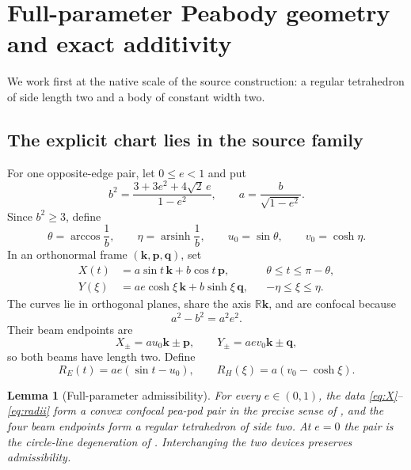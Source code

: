 \documentclass[11pt]{article}
\numberwithin{equation}{section}
\newtheorem{lemma}[theorem]{Lemma}
\theoremstyle{remark}
\newcommand{\R}{\mathbb{R}}
\newcommand{\arsinh}{\operatorname{arsinh}}
\begin{document}
\section{Full-parameter Peabody geometry and exact additivity}
\label{sec:additivity}

We work first at the native scale of the source construction: a regular tetrahedron of side length two and a body of constant width two.

\subsection{The explicit chart lies in the source family}

For one opposite-edge pair, let \(0\le e<1\) and put
\begin{equation}
  b^2=\frac{3+3e^2+4\sqrt2\,e}{1-e^2},
  \qquad
  a=\frac b{\sqrt{1-e^2}}.
  \label{eq:ab}
\end{equation}
Since \(b^2\ge3\), define
\[
  \theta=\arccos\frac1b,
  \qquad
  \eta=\arsinh\frac1b,
  \qquad
  u_0=\sin\theta,
  \qquad
  v_0=\cosh\eta.
\]
In an orthonormal frame \((\mathbf k,\mathbf p,\mathbf q)\), set
\begin{align}
  X(t)&=a\sin t\,\mathbf k+b\cos t\,\mathbf p,
  &&\theta\le t\le\pi-\theta,\label{eq:X}\\
  Y(\xi)&=ae\cosh\xi\,\mathbf k+b\sinh\xi\,\mathbf q,
  &&-\eta\le\xi\le\eta.\label{eq:Y}
\end{align}
The curves lie in orthogonal planes, share the axis \(\R\mathbf k\), and are confocal because
\[
  a^2-b^2=a^2e^2.
\]
Their beam endpoints are
\[
  X_\pm=a u_0\mathbf k\pm\mathbf p,
  \qquad
  Y_\pm=ae v_0\mathbf k\pm\mathbf q,
\]
so both beams have length two.  Define
\begin{equation}
  R_E(t)=ae(\sin t-u_0),
  \qquad
  R_H(\xi)=a(v_0-\cosh\xi).
  \label{eq:radii}
\end{equation}

\begin{lemma}[Full-parameter admissibility]
\label{lem:admissible}
For every \(e\in(0,1)\), the data \eqref{eq:X}--\eqref{eq:radii} form a convex confocal pea-pod pair in the precise sense of \cite[Definition~3.5]{ArelioMontejanoOliveros2023}, and the four beam endpoints form a regular tetrahedron of side two.  At \(e=0\) the pair is the circle-line degeneration of \cite[Section~5.3]{ArelioMontejanoOliveros2023}.  Interchanging the two devices preserves admissibility.
\end{lemma}
\end{document}
